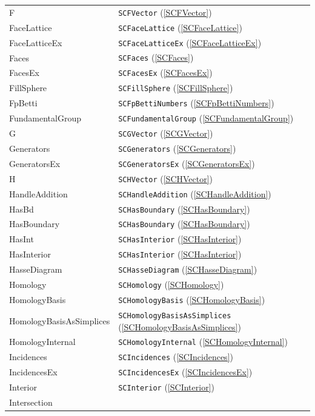 \documentclass[a4paper,11pt]{report}
\begin{document}
{{ \begin{center}
\begin{tabular}{ll}F&
\texttt{SCFVector} (\ref{SCFVector})\\
FaceLattice&
\texttt{SCFaceLattice} (\ref{SCFaceLattice})\\
FaceLatticeEx&
\texttt{SCFaceLatticeEx} (\ref{SCFaceLatticeEx})\\
Faces&
\texttt{SCFaces} (\ref{SCFaces})\\
FacesEx&
\texttt{SCFacesEx} (\ref{SCFacesEx})\\
FillSphere&
\texttt{SCFillSphere} (\ref{SCFillSphere})\\
FpBetti&
\texttt{SCFpBettiNumbers} (\ref{SCFpBettiNumbers})\\
FundamentalGroup&
\texttt{SCFundamentalGroup} (\ref{SCFundamentalGroup})\\
G&
\texttt{SCGVector} (\ref{SCGVector})\\
Generators&
\texttt{SCGenerators} (\ref{SCGenerators})\\
GeneratorsEx&
\texttt{SCGeneratorsEx} (\ref{SCGeneratorsEx})\\
H&
\texttt{SCHVector} (\ref{SCHVector})\\
HandleAddition&
\texttt{SCHandleAddition} (\ref{SCHandleAddition})\\
HasBd&
\texttt{SCHasBoundary} (\ref{SCHasBoundary})\\
HasBoundary&
\texttt{SCHasBoundary} (\ref{SCHasBoundary})\\
HasInt&
\texttt{SCHasInterior} (\ref{SCHasInterior})\\
HasInterior&
\texttt{SCHasInterior} (\ref{SCHasInterior})\\
HasseDiagram&
\texttt{SCHasseDiagram} (\ref{SCHasseDiagram})\\
Homology&
\texttt{SCHomology} (\ref{SCHomology})\\
HomologyBasis&
\texttt{SCHomologyBasis} (\ref{SCHomologyBasis})\\
HomologyBasisAsSimplices&
\texttt{SCHomologyBasisAsSimplices} (\ref{SCHomologyBasisAsSimplices})\\
HomologyInternal&
\texttt{SCHomologyInternal} (\ref{SCHomologyInternal})\\
Incidences&
\texttt{SCIncidences} (\ref{SCIncidences})\\
IncidencesEx&
\texttt{SCIncidencesEx} (\ref{SCIncidencesEx})\\
Interior&
\texttt{SCInterior} (\ref{SCInterior})\\
Intersection&

\end{tabular}
\end{center}}}
\end{document}
